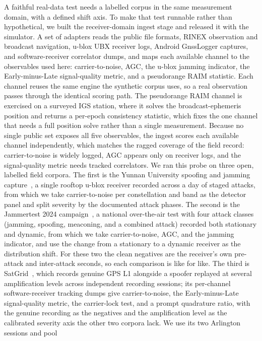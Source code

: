 \documentclass[conference]{IEEEtran}
\begin{document}
A faithful real-data test needs a labelled corpus in the same measurement domain,
with a defined shift axis. To make that test runnable rather than hypothetical, we
built the receiver-domain ingest stage and released it with the simulator. A set of
adapters reads the public file formats, RINEX observation and broadcast navigation,
u-blox UBX receiver logs, Android GnssLogger captures, and software-receiver
correlator dumps, and maps each available channel to the observables used here:
carrier-to-noise, AGC, the u-blox jamming indicator, the Early-minus-Late
signal-quality metric, and a pseudorange RAIM statistic. Each channel reuses the
same engine the synthetic corpus uses, so a real observation passes through the
identical scoring path. The pseudorange RAIM channel is exercised on a surveyed IGS
station, where it solves the broadcast-ephemeris position and returns a per-epoch
consistency statistic, which fixes the one channel that needs a full position solve
rather than a single measurement. Because no single public set exposes all five
observables, the ingest scores each available channel independently, which matches
the ragged coverage of the field record: carrier-to-noise is widely logged, AGC
appears only on receiver logs, and the signal-quality metric needs tracked
correlators. We ran this probe on three open, labelled field corpora. The first is the Yunnan
University spoofing and jamming capture~\cite{yunnan}, a single rooftop u-blox
receiver recorded across a day of staged attacks, from which we take carrier-to-noise
per constellation and band as the detector panel and split severity by the documented
attack phases. The second is the Jammertest 2024 campaign~\cite{jammertest}, a
national over-the-air test with four attack classes (jamming, spoofing, meaconing, and a combined attack)
recorded both stationary and dynamic, from which we take carrier-to-noise, AGC, and
the jamming indicator, and use the change from a stationary to a dynamic receiver as
the distribution shift. For these two the clean negatives are the receiver's own
pre-attack and inter-attack seconds, so each comparison is like for like. The third
is SatGrid~\cite{satgrid}, which records genuine GPS L1 alongside a spoofer replayed
at several amplification levels across independent recording sessions; its per-channel
software-receiver tracking dumps give carrier-to-noise, the Early-minus-Late
signal-quality metric, the carrier-lock test, and a prompt quadrature ratio, with the
genuine recording as the negatives and the amplification level as the calibrated
severity axis the other two corpora lack. We use its two Arlington sessions and pool
\end{document}
